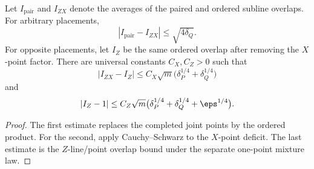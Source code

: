 \begin{lemma}
	\label{lem:qld-first-route-overlap-components}
	\leanok
	Let $I_{\mathrm{pair}}$ and $I_{ZX}$ denote the averages of the paired and
	ordered subline overlaps. For arbitrary placements,
	\[
		|I_{\mathrm{pair}}-I_{ZX}|\leq\sqrt{4\delta_Q}.
	\]
	For opposite placements, let $I_Z$ be the same ordered overlap after
	removing the $X$-point factor. There are universal constants $C_X,C_Z>0$
	such that
	\[
		|I_{ZX}-I_Z|
		\leq C_X\sqrt m\bigl(\delta_P^{1/4}+\delta_Q^{1/4}\bigr)
	\]
	and
	\[
		|I_Z-1|\leq C_Z\sqrt m
		\bigl(\delta_P^{1/4}+\delta_Q^{1/4}+\eps^{1/4}\bigr).
	\]
\end{lemma}
\begin{proof}
	\leanok
	The first estimate replaces the completed joint points by the ordered
	product. For the second, apply Cauchy--Schwarz to the $X$-point deficit. The
	last estimate is the $Z$-line/point overlap bound under the separate
	one-point mixture law.
\end{proof}

